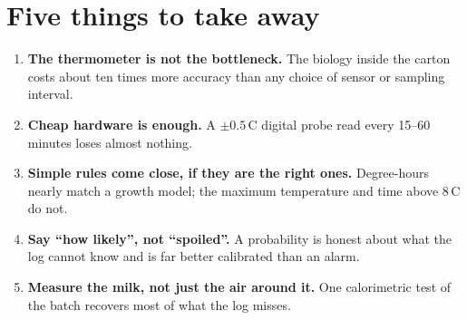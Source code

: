 \documentclass[11pt,a4paper,twoside,openany]{book}
\newcommand{\degC}{\,\textdegree C}
\theoremstyle{plain}\newtheorem{proposition}{Proposition}\newtheorem{corollary}{Corollary}
\theoremstyle{definition}\newtheorem{definition}{Definition}[chapter]
\begin{document}
\vspace{-4pt}\section*{Five things to take away}
\begin{enumerate}[leftmargin=1.8em,itemsep=2pt]
\item \textbf{The thermometer is not the bottleneck.} The biology inside the carton costs about ten times more accuracy than any choice of sensor or sampling interval.
\item \textbf{Cheap hardware is enough.} A $\pm0.5$\degC{} digital probe read every 15--60 minutes loses almost nothing.
\item \textbf{Simple rules come close, if they are the right ones.} Degree-hours nearly match a growth model; the maximum temperature and time above 8\degC{} do not.
\item \textbf{Say ``how likely'', not ``spoiled''.} A probability is honest about what the log cannot know and is far better calibrated than an alarm.
\item \textbf{Measure the milk, not just the air around it.} One calorimetric test of the batch recovers most of what the log misses.
\end{enumerate}

\tableofcontents
\listoffigures
\listoftables
\end{document}
